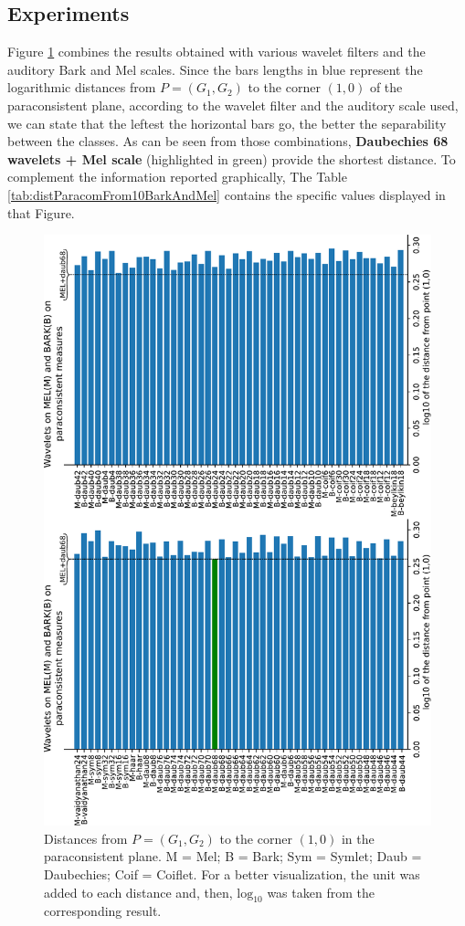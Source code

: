 \subsection{Experiments}
	\par Figure \ref{fig:paraconsistentfull} combines the results obtained with various wavelet filters and the auditory Bark and Mel scales. Since the bars lengths in blue represent the logarithmic distances from $P=(G_1,G_2)$ to the corner $(1,0)$ of the paraconsistent plane, according to the wavelet filter and the auditory scale used, we can state that the leftest the horizontal bars go, the better the separability between the classes. As can be seen from those combinations, \textbf{Daubechies 68 wavelets + Mel scale} (highlighted in green) provide the shortest distance. To complement the information reported graphically, The Table \ref{tab:distParacomFrom10BarkAndMel} contains the specific values displayed in that Figure.
	\\
	\begin{figure}[H]
		\centering
		\includegraphics[angle=-90,scale=.6]{images/results/paraconsistentPlane/ParaconsistentFull.pdf}
		\caption{Distances from $P=(G_1,G_2)$ to the corner $(1,0)$ in the paraconsistent plane. M = Mel; B = Bark; Sym = Symlet; Daub = Daubechies; Coif = Coiflet. For a better visualization, the unit was added to each distance and, then, $\text{log}_{10}$ was taken from the corresponding result.}
		\label{fig:paraconsistentfull}
	\end{figure}
